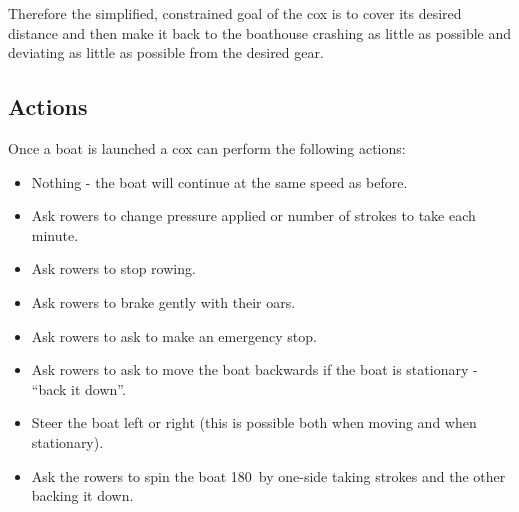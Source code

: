       Therefore the simplified, constrained goal of the cox is to cover its desired distance and then make it back to the boathouse crashing as little as possible and deviating as little as possible from the desired gear.

      \subsection{Actions} \label{model:cox:actions}
      Once a boat is launched a cox can perform the following actions:
      \begin{itemize}
        \item Nothing - the boat will continue at the same speed as before.
        \item Ask rowers to change pressure applied or number of
          strokes to take each minute.
        \item Ask rowers to stop rowing.
        \item Ask rowers to brake gently with their oars.
        \item Ask rowers to ask to make an emergency stop.
        \item Ask rowers to ask to move the boat backwards if the boat
          is stationary - ``back it down''.
        \item Steer the boat left or right (this is possible both when moving and when stationary).
        \item Ask the rowers to spin the boat 180\textdegree\ by
          one-side taking strokes and the other backing it down.
      \end{itemize}
      
